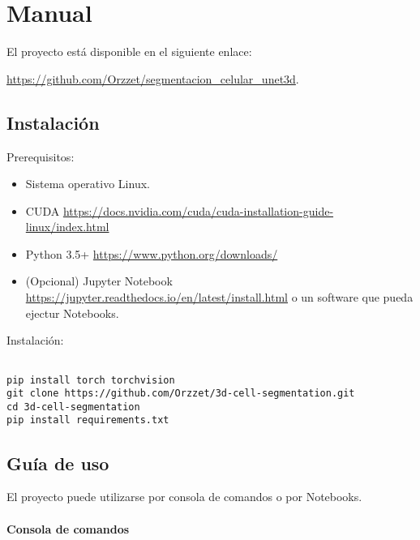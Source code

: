 \chapter{Manual}\label{manual}

El proyecto está disponible en el siguiente enlace:

\url{https://github.com/Orzzet/segmentacion_celular_unet3d}. 

\section{Instalación}

Prerequisitos:

\begin{itemize}
\item Sistema operativo Linux.
\item CUDA \url{https://docs.nvidia.com/cuda/cuda-installation-guide-linux/index.html}
\item Python 3.5+ \url{https://www.python.org/downloads/}
\item (Opcional) Jupyter Notebook \url{https://jupyter.readthedocs.io/en/latest/install.html} o un software que pueda ejectur Notebooks.
\end{itemize}


Instalación:

\begin{verbatim}

pip install torch torchvision
git clone https://github.com/Orzzet/3d-cell-segmentation.git
cd 3d-cell-segmentation
pip install requirements.txt

\end{verbatim}

\section{Guía de uso}
El proyecto puede utilizarse por consola de comandos o por Notebooks.

\subsubsection{Consola de comandos}


